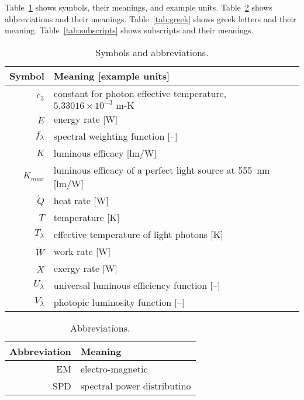 
\noindent 
Table~\ref{tab:symbols} shows symbols, their meanings, and example units.
Table~\ref{tab:abbreviations} shows abbreviations and their meanings.
Table~\ref{tab:greek} shows greek letters and their meaning.
Table~\ref{tab:subscripts} shows subscripts and their meanings.


  
\begin{table}
\centering %
\caption{Symbols and abbreviations.}
\begin{tabular}{r l}
\toprule
Symbol & Meaning [example units] \\
\midrule
$c_3$ & constant for photon effective temperature, $5.33016 \times 10^{-3} \text{ m-K}$ \\
$\dot{E}$ & energy rate [W] \\
$f_\lambda$ & spectral weighting function [--] \\
$K$ & luminous efficacy [lm/W] \\
$K_{max}$ & luminous efficacy of a perfect light source at 555~nm [lm/W] \\
$\dot{Q}$ & heat rate [W] \\
$T$ & temperature [K] \\
$T_\lambda$ & effective temperature of light photons [K] \\
$\dot{W}$ & work rate [W] \\
$\dot{X}$ & exergy rate [W] \\
$U_\lambda$ & universal luminous efficiency function [--] \\
$V_\lambda$ & photopic luminosity function [--] \\
\bottomrule
\end{tabular}
\label{tab:symbols}
\end{table}


  
\begin{table}
\centering %
\caption{Abbreviations.}
\begin{tabular}{r l}
\toprule
Abbreviation & Meaning \\
\midrule
EM & electro-magnetic \\
SPD & spectral power distributino \\
\bottomrule
\end{tabular}
\label{tab:abbreviations}
\end{table}


